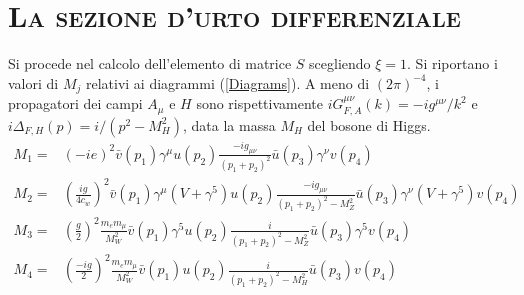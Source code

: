 \documentclass[11pt]{article}
\begin{document}
    \section{\centering\textsc{La sezione d'urto differenziale} } %
    Si procede nel calcolo dell'elemento di matrice $S$ scegliendo $\xi=1$. Si riportano i valori di $M_j$ relativi ai diagrammi (\ref{Diagrams}). A meno di $(2\pi)^{-4}$, i propagatori dei campi $A_\mu$ e $H$ sono rispettivamente
    $iG_{F,A}^{\mu\nu}(k)=-ig^{\mu\nu}/k^2$ e $i\Delta_{F,H}(p)=i/(p^2-M_H^2)$, data la massa $M_H$ del bosone di Higgs.
    \begin{align}
    M_1=&\left(-ie\right)^2\bar{v}(p_1)\gamma^\mu u(p_2)\frac{-ig_{\mu\nu}}{(p_1+p_2)^2}\bar{u}(p_3)\gamma^\nu v(p_4)\label{M1}\\
    M_2=&\left(\frac{ig}{4c_w}\right)^2\bar{v}(p_1)\gamma^\mu(V+\gamma^5) u(p_2)\frac{-ig_{\mu\nu}}{(p_1+p_2)^2-M_Z^2}\bar{u}(p_3)\gamma^\nu(V+\gamma^5) v(p_4)\label{M2}\\
    M_3=&\left(\frac{g}{2}\right)^2\frac{m_em_\mu}{M_W^2}\bar{v}(p_1)\gamma^5u(p_2)\frac{i}{(p_1+p_2)^2-M_Z^2}\bar{u}(p_3)\gamma^5v(p_4)\label{M3}\\
    M_4=&\left(\frac{-ig}{2}\right)^2\frac{m_em_\mu}{M_W^2}\bar{v}(p_1)u(p_2)\frac{i}{(p_1+p_2)^2-M_H^2}\bar{u}(p_3)v(p_4)\label{M4}
    \end{align}
\end{document}
